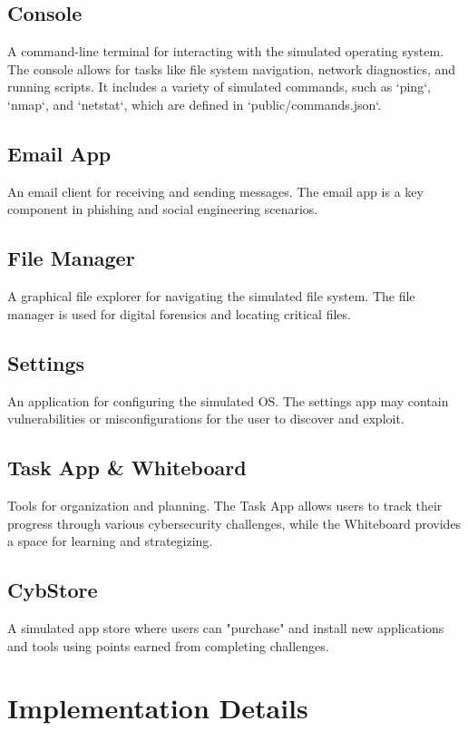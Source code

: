 \documentclass{report}
\begin{document}
\section{Console}
A command-line terminal for interacting with the simulated operating system. The console allows for tasks like file system navigation, network diagnostics, and running scripts. It includes a variety of simulated commands, such as `ping`, `nmap`, and `netstat`, which are defined in `public/commands.json`.

\section{Email App}
An email client for receiving and sending messages. The email app is a key component in phishing and social engineering scenarios.

\section{File Manager}
A graphical file explorer for navigating the simulated file system. The file manager is used for digital forensics and locating critical files.

\section{Settings}
An application for configuring the simulated OS. The settings app may contain vulnerabilities or misconfigurations for the user to discover and exploit.

\section{Task App \& Whiteboard}
Tools for organization and planning. The Task App allows users to track their progress through various cybersecurity challenges, while the Whiteboard provides a space for learning and strategizing.

\section{CybStore}
A simulated app store where users can "purchase" and install new applications and tools using points earned from completing challenges.

\chapter{Implementation Details}
\end{document}
